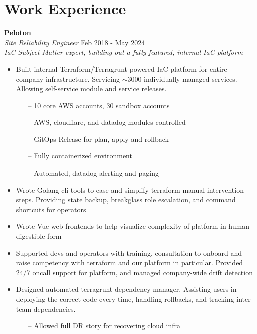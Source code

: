\section{Work Experience}

\large{\textbf{Peloton}} \\
\textit{Site Reliability Engineer} \hfill Feb 2018 - May 2024 \\[3.75pt]
\textit{IaC Subject Matter expert, building out a fully featured, internal IaC platform}

\begin{minipage}[t]{\linewidth}
  \begin{itemize}
    \item Built internal Terraform/Terragrunt-powered IaC platform for entire company infrastructure. Servicing $\sim$3000 individually managed services. Allowing self-service module and service releases.
              \begin{itemize}
                  \item[--] 10 core AWS accounts, 30 sandbox accounts
                  \item[--] AWS, cloudflare, and datadog modules controlled
                  \item[--] GitOps Release for plan, apply and rollback
                  \item[--] Fully containerized environment
                  \item[--] Automated, datadog alerting and paging
              \end{itemize}
    \item Wrote Golang cli tools to ease and simplify terraform manual intervention steps. Providing state backup, breakglass role escalation, and command shortcuts for operators
    \item Wrote Vue web frontends to help visualize complexity of platform in human digestible form
    \item Supported devs and operators with training, consultation to onboard and raise competency with terraform and our platform in particular. Provided 24/7 oncall support for platform, and managed company-wide drift detection
    \item Designed automated terragrunt dependency manager. Assisting users in deploying the correct code every time, handling rollbacks, and tracking inter-team dependencies.
      \begin{itemize}
        \item[--] Allowed full DR story for recovering cloud infra

\end{itemize}
\end{itemize}
\end{minipage}
